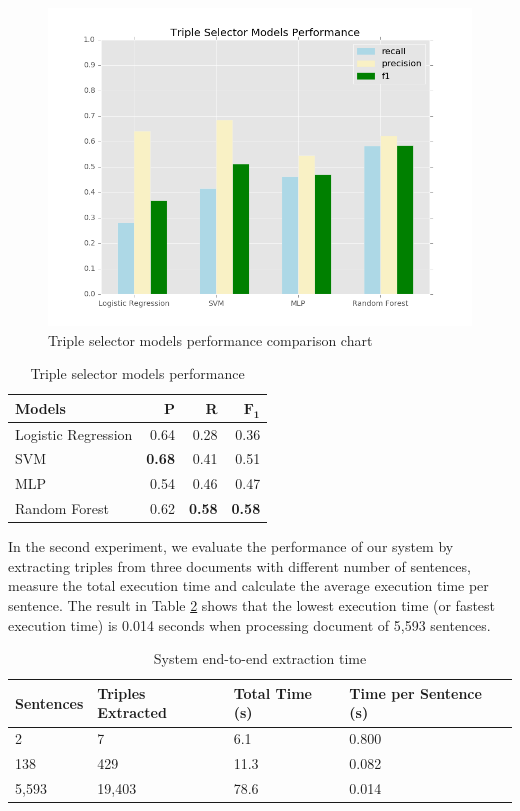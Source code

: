 \documentclass[conference,compsoc]{IEEEtran}
\begin{document}
\begin{figure}
\includegraphics[scale=0.4]{models_performance}
\caption{Triple selector models performance comparison chart}
\label{fig_models_performance}
\end{figure}

\begin{table}[!t]
\renewcommand{\arraystretch}{1.5}
\caption{Triple selector models performance}
\label{table_models_performance}
\centering
\begin{tabular}{l r r r}
\hline
\textbf{Models} & \textbf{P} & \textbf{R} & $\mathbf{F_1}$ \\
\hline
Logistic Regression & 0.64 & 0.28 & 0.36 \\
SVM & \textbf{0.68} & 0.41 & 0.51 \\
MLP & 0.54 & 0.46 & 0.47 \\
Random Forest & 0.62 & \textbf{0.58} & \textbf{0.58} \\
\hline
\end{tabular}
\end{table}

In the second experiment, we evaluate the performance of our system by extracting triples from three documents with different number of sentences, measure the total execution time and calculate the average execution time per sentence. The result in Table \ref{table_system_extraction_time} shows that the lowest execution time (or fastest execution time) is 0.014 seconds when processing document of 5,593 sentences.

\begin{table}[!t]
	\renewcommand{\arraystretch}{1.5}
	\caption{System end-to-end extraction time}
	\label{table_system_extraction_time}
	\centering
	\begin{tabular}{l p{1.2cm} p{1.2cm} p{1.2cm}}
		\hline
		\textbf{Sentences} & \textbf{Triples Extracted} & \textbf{Total Time (s)} & \textbf{Time per Sentence (s)} \\
		\hline
		2 & 7 & 6.1 & 0.800 \\
		138 & 429 & 11.3 & 0.082 \\
		5,593 & 19,403 & 78.6 & 0.014 \\
		\hline
	\end{tabular}
\end{table}
\end{document}
